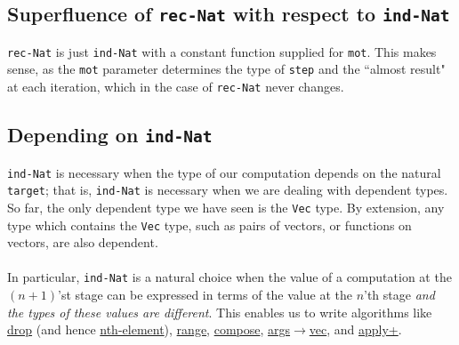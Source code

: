 \documentclass{article}
\newcommand{\ttt}[1]{\texttt{#1}}
\begin{document}
\subsection{Superfluence of \ttt{rec-Nat} with respect to \ttt{ind-Nat}}
\ttt{rec-Nat} is just \ttt{ind-Nat} with a constant function supplied for \ttt{mot}. This makes sense, as the \ttt{mot} parameter determines the type of \ttt{step} and the ``almost result" at each iteration, which in the case of \ttt{rec-Nat} never changes.
\subsection{Depending on \ttt{ind-Nat}}
\ttt{ind-Nat} is necessary when the type of our computation depends on the natural \ttt{target}; that is, \ttt{ind-Nat} is necessary when we are dealing with dependent types. So far, the only dependent type we have seen is the \ttt{Vec} type. By extension, any type which contains the \ttt{Vec} type, such as pairs of vectors, or functions on vectors, are also dependent.
\\ \\
In particular, \ttt{ind-Nat} is a natural choice when the value of a computation at the \((n + 1)\)'st stage can be expressed in terms of the value at the \(n\)'th stage \textit{and the types of these values are different}. This enables us to write algorithms like \hyperref[code:drop]{drop} (and hence \hyperref[code:nth-element]{nth-element}), \hyperref[code:range]{range}, \hyperref[code:compose]{compose}, \hyperref[code:args-to-vec]{args\(\to\)vec}, and \hyperref[code:apply+]{apply+}.
\end{document}
